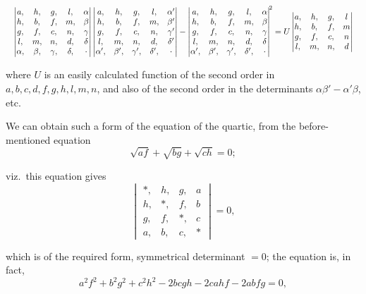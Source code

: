 \documentclass[11pt]{article}
\begin{document}
\[
\resizebox{\textwidth}{!}{$\displaystyle
\begin{vmatrix}
a, & h, & g, & l, & \alpha \\
h, & b, & f, & m, & \beta \\
g, & f, & c, & n, & \gamma \\
l, & m, & n, & d, & \delta \\
\alpha, & \beta, & \gamma, & \delta, & \cdot
\end{vmatrix}
\begin{vmatrix}
a, & h, & g, & l, & \alpha' \\
h, & b, & f, & m, & \beta' \\
g, & f, & c, & n, & \gamma' \\
l, & m, & n, & d, & \delta' \\
\alpha', & \beta', & \gamma', & \delta', & \cdot
\end{vmatrix} -
\begin{vmatrix}
a, & h, & g, & l, & \alpha \\
h, & b, & f, & m, & \beta \\
g, & f, & c, & n, & \gamma \\
l, & m, & n, & d, & \delta \\
\alpha', & \beta', & \gamma', & \delta', & \cdot
\end{vmatrix}^{\!2}
= U
\begin{vmatrix}
a, & h, & g, & l \\
h, & b, & f, & m \\
g, & f, & c, & n \\
l, & m, & n, & d
\end{vmatrix}
$}
\]

where $U$ is an easily calculated function of the second order in $a, b, c, d, f, g, h, l, m, n$, and also of the second order in the determinants $\alpha\beta' - \alpha'\beta$, etc.

\medskip

We can obtain such a form of the equation of the quartic, from the before-mentioned equation
\[
\sqrt{af} + \sqrt{bg} + \sqrt{ch} = 0;
\]

viz.\ this equation gives
\[
\begin{vmatrix}
\ast, & h, & g, & a \\
h, & \ast, & f, & b \\
g, & f, & \ast, & c \\
a, & b, & c, & \ast
\end{vmatrix} = 0,
\]

which is of the required form, symmetrical determinant $= 0$; the equation is, in fact,
\[
a^2 f^2 + b^2 g^2 + c^2 h^2 - 2bcgh - 2cahf - 2abfg = 0,
\]
\end{document}
